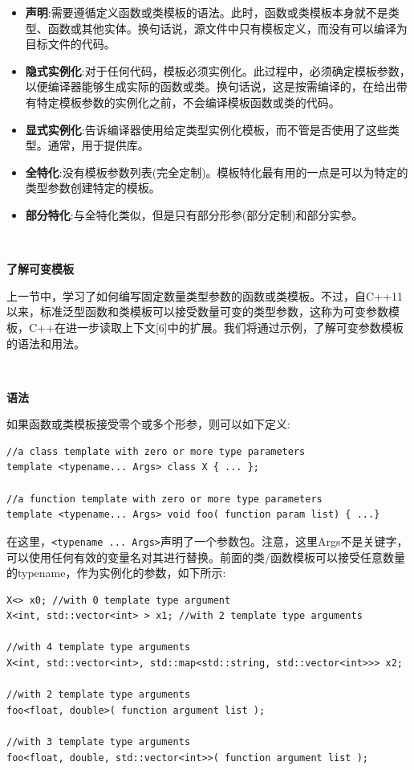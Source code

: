 \begin{itemize}
	\item \textbf{声明}:需要遵循定义函数或类模板的语法。此时，函数或类模板本身就不是类型、函数或其他实体。换句话说，源文件中只有模板定义，而没有可以编译为目标文件的代码。
	\item \textbf{隐式实例化}:对于任何代码，模板必须实例化。此过程中，必须确定模板参数，以便编译器能够生成实际的函数或类。换句话说，这是按需编译的，在给出带有特定模板参数的实例化之前，不会编译模板函数或类的代码。
	\item \textbf{显式实例化}:告诉编译器使用给定类型实例化模板，而不管是否使用了这些类型。通常，用于提供库。
	\item \textbf{全特化}:没有模板参数列表(完全定制)。模板特化最有用的一点是可以为特定的类型参数创建特定的模板。
	\item \textbf{部分特化}:与全特化类似，但是只有部分形参(部分定制)和部分实参。
\end{itemize}

\noindent\textbf{}\ \par
\textbf{了解可变模板} \ \par
上一节中，学习了如何编写固定数量类型参数的函数或类模板。不过，自C++11以来，标准泛型函数和类模板可以接受数量可变的类型参数，这称为可变参数模板，C++在进一步读取上下文[6]中的扩展。我们将通过示例，了解可变参数模板的语法和用法。 \par

\noindent\textbf{}\ \par
\textbf{语法} \ \par
如果函数或类模板接受零个或多个形参，则可以如下定义: \par

\begin{lstlisting}[caption={}]
//a class template with zero or more type parameters
template <typename... Args> class X { ... };

//a function template with zero or more type parameters
template <typename... Args> void foo( function param list) { ...}
\end{lstlisting}

在这里，\texttt{<typename ... Args>}声明了一个参数包。注意，这里Args不是关键字，可以使用任何有效的变量名对其进行替换。前面的类/函数模板可以接受任意数量的typename，作为实例化的参数，如下所示: \par

\begin{lstlisting}[caption={}]
X<> x0; //with 0 template type argument
X<int, std::vector<int> > x1; //with 2 template type arguments

//with 4 template type arguments
X<int, std::vector<int>, std::map<std::string, std::vector<int>>> x2;

//with 2 template type arguments
foo<float, double>( function argument list );

//with 3 template type arguments
foo<float, double, std::vector<int>>( function argument list );
\end{lstlisting}

